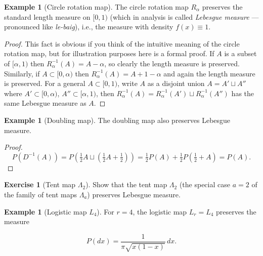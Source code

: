 \documentclass[11pt]{report}
\theoremstyle{plain}
\theoremstyle{definition}
\newtheorem{example}[thm]{Example}
\newtheorem{xexercise}[thm]{Exercise}
\begin{document}
\begin{example}[Circle rotation map]
The circle rotation map $R_\alpha$ preserves the
standard length measure on $[0,1)$ (which in analysis
is called \emph{Lebesgue measure} --- pronounced like
\emph{le-baig}), i.e., the measure with density
$f(x)\equiv 1$.
\end{example}

\begin{proof}
This fact is obvious if you think of the intuitive
meaning of the circle rotation map, but for
illustration purposes here is a formal proof. If $A$
is a subset of $[\alpha,1)$ then
$R_\alpha^{-1}(A) = A-\alpha$, so clearly the length
measure is preserved. Similarly, if
$A \subset [0,\alpha)$ then
$R_\alpha^{-1}(A) = A+1-\alpha$ and again the length
measure is preserved. For a general $A\subset[0,1)$,
write $A$ as a disjoint union $A=A'\sqcup A''$ where
$A'\subset[0,\alpha)$, $A''\subset[\alpha,1)$, then
$R_\alpha^{-1}(A) = R_\alpha^{-1}(A')\sqcup
R_\alpha^{-1}(A'')$
has the same Lebesgue measure as $A$.
\end{proof}

\begin{example}[Doubling map]
The doubling map also preserves Lebesgue measure.
\end{example}

\begin{proof}

\[
P(D^{-1}(A)) =
P\left(\tfrac12 A \sqcup \left(\tfrac12 A+\tfrac12\right) \right)
= \tfrac12 P(A)
+ \tfrac12 P(\tfrac12+A) =
P(A).
\]

\end{proof}

\begin{xexercise}[Tent map $\Lambda_2$]
Show that the tent map $\Lambda_2$ (the special case
$a=2$ of the family of tent maps $\Lambda_a$)
preserves Lebesgue measure.
\end{xexercise}

\begin{example}[Logistic map $L_4$]
For $r=4$, the logistic map $L_r=L_4$ preserves the
measure

\[
P(dx) = \frac{1}{\pi \sqrt{x(1-x)}}\,dx.
\]

\end{example}
\end{document}

